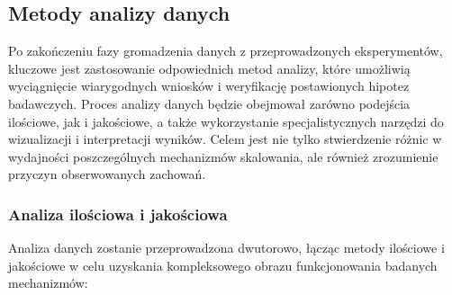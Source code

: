 \subsection{Metody analizy danych}
Po zakończeniu fazy gromadzenia danych z przeprowadzonych eksperymentów, kluczowe jest zastosowanie odpowiednich metod analizy, które umożliwią wyciągnięcie wiarygodnych wniosków i weryfikację postawionych hipotez badawczych. Proces analizy danych będzie obejmował zarówno podejścia ilościowe, jak i jakościowe, a także wykorzystanie specjalistycznych narzędzi do wizualizacji i interpretacji wyników. Celem jest nie tylko stwierdzenie różnic w wydajności poszczególnych mechanizmów skalowania, ale również zrozumienie przyczyn obserwowanych zachowań.

\subsubsection{Analiza ilościowa i jakościowa}
Analiza danych zostanie przeprowadzona dwutorowo, łącząc metody ilościowe i jakościowe w celu uzyskania kompleksowego obrazu funkcjonowania badanych mechanizmów:


